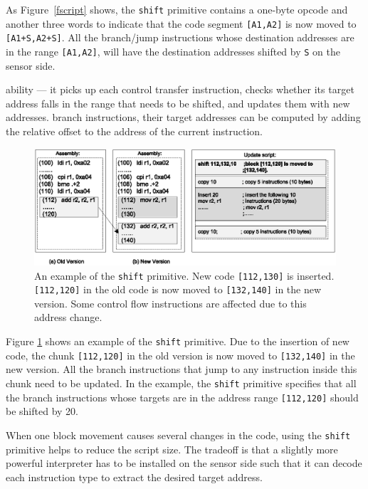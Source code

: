 As Figure~\ref{fscript} shows, the {\tt shift} primitive contains a one-byte opcode and another three words to indicate 
that
the code segment {\tt [A1,A2]} is now moved to {\tt [A1+S,A2+S]}. All the branch/jump instructions whose destination 
addresses are in the range {\tt [A1,A2]}, will have the destination addresses shifted by {\tt S} on the sensor side.

ability --- it picks up each control transfer instruction, checks whether its target address falls in the range that 
needs to be shifted, and updates them with new addresses.
branch instructions, their target addresses can be computed by adding the relative offset to the address of the current 
instruction.

\begin{figure}[htbp]
\centering
\includegraphics[width=6in]{figures/shift.eps}
\caption[An example of the {\tt shift} primitive.]{An example of the {\tt shift} primitive. New code {\tt [112,130]} is 
inserted. {\tt [112,120]} in the old code is now moved to {\tt [132,140]} 
in the new version. Some control flow instructions are affected due to this address change.
}
\label{fshift}
\end{figure}

Figure \ref{fshift} shows an example of the {\tt shift} primitive. Due to the insertion of
new code, the chunk {\tt [112,120]} in the old version is now moved to {\tt [132,140]} 
in the new version. All the branch instructions that
jump to any instruction inside this chunk need to be updated. In the example, the {\tt shift} primitive
specifies that all the branch instructions whose targets are in the address range {\tt [112,120]} should be shifted by 
20. 

When one block movement causes several changes in the code, using the {\tt shift} primitive helps to reduce the script 
size. The tradeoff is that a slightly more powerful interpreter has to be installed on the sensor side such that it can 
decode each instruction type to extract the desired target address. 

